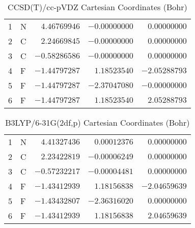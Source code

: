 \documentclass[10pt,oneside]{article}
\begin{document}
\begin{table}[h!]
\centering
\caption{CCSD(T)/cc-pVDZ Cartesian Coordinates (Bohr)}
\begin{tabular}{llrrr}
1  & N  & $ 4.46769946$ & $-0.00000000$ & $ 0.00000000$ \\
2  & C  & $ 2.24669845$ & $-0.00000000$ & $ 0.00000000$ \\
3  & C  & $-0.58286586$ & $-0.00000000$ & $ 0.00000000$ \\
4  & F  & $-1.44797287$ & $ 1.18523540$ & $-2.05288793$ \\
5  & F  & $-1.44797287$ & $-2.37047080$ & $-0.00000000$ \\
6  & F  & $-1.44797287$ & $ 1.18523540$ & $ 2.05288793$ \\
\end{tabular}
\end{table}

\begin{table}[h!]
\centering
\caption{B3LYP/6-31G(2df,p) Cartesian Coordinates (Bohr)}
\begin{tabular}{llrrr}
1  & N  & $ 4.41327436$ & $ 0.00012376$ & $ 0.00000000$ \\
2  & C  & $ 2.23422819$ & $-0.00006249$ & $ 0.00000000$ \\
3  & C  & $-0.57232217$ & $-0.00004481$ & $ 0.00000000$ \\
4  & F  & $-1.43412939$ & $ 1.18156838$ & $-2.04659639$ \\
5  & F  & $-1.43432807$ & $-2.36316020$ & $ 0.00000000$ \\
6  & F  & $-1.43412939$ & $ 1.18156838$ & $ 2.04659639$ \\
\end{tabular}
\end{table}

\clearpage
\end{document}
